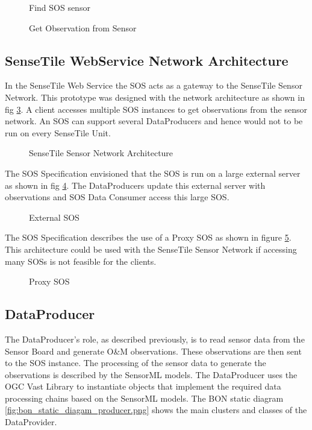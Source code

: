 \documentclass[]{final_report}
\begin{document}
\begin{figure}[h]
\caption{Find SOS sensor}\label{fig:GetMeta}
\end{figure}

\begin{figure}[h]
\caption{Get Observation from Sensor}\label{fig:GetObs}
\end{figure}
\newpage
\subsection{SenseTile WebService Network Architecture}
\label{subsec:SenseTile WebService Network Architecture}
In the SenseTile Web Service the SOS acts as a gateway to the SenseTile Sensor Network. This prototype was designed with the network architecture as shown in fig \ref{fig:Deployment_network}. A client accesses multiple SOS instances to get observations from the sensor network. An SOS can support several DataProducers and hence would not to be run on every SenseTile Unit. 

\begin{figure}[h]
\caption{SenseTile Sensor Network Architecture}\label{fig:Deployment_network}
\end{figure}
The SOS Specification envisioned that the SOS is run on a large external server as shown in fig \ref{fig:Deployment_ext_sos}. The DataProducers update this external server with observations and SOS Data Consumer access this large SOS.
\begin{figure}[h]
\caption{External SOS}\label{fig:Deployment_ext_sos}
\end{figure}
The SOS Specification describes the use of a Proxy SOS as shown in figure \ref{fig:Deployment_sos_aggr}. This architecture could be used with the SenseTile Sensor Network if accessing many SOSs is not feasible for the clients.
\begin{figure}[h]
\caption{Proxy SOS}\label{fig:Deployment_sos_aggr}
\end{figure}

\newpage
\subsection{DataProducer}\label{DataProducerHigh}
The DataProducer's role, as described previously, is to read sensor data from the Sensor Board and generate O\&M observations. These observations are then sent to the SOS instance. The processing of the sensor data to generate the observations is described by the SensorML models. The DataProducer uses the OGC Vast Library to instantiate objects that implement the required data processing chains based on the SensorML models. The BON static diagram \ref{fig:bon_static_diagam_producer.png}
 shows the main clusters and classes of the DataProvider.
\end{document}
